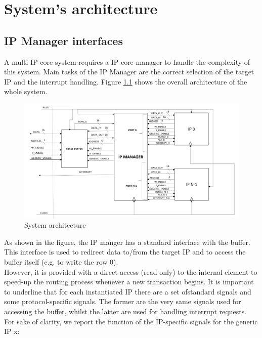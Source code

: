 \chapter{System's architecture}
\label{chap1}
\section{IP Manager interfaces}
A multi IP-core system requires a IP core manager to handle the complexity of this system.
Main tasks of the IP Manager are the correct selection of the target IP and the interrupt handling. Figure \ref{00fig} shows the overall architecture of the whole system. 
	\begin{figure}[h]
		\centering
		\includegraphics[width=\textwidth]{chapters/figures/00.png}  
		\caption{System architecture}
		\label{00fig}
	\end{figure}
	
	As shown in the figure, the IP manger has a standard interface with the buffer. This interface is used to redirect data to/from the target IP and to access the buffer itself (e.g. to write the row 0).\\ However, it is
	provided with a direct access (read-only) to the internal element to speed-up the routing process whenever a new transaction begins. It is important to underline that for each instantiated IP there are a set ofstandard signals and some protocol-specific signals. The former are the very same signals used for accessing the buffer, whilst the latter are used for handling interrupt requests. For sake of clarity, we report the function of the IP-specific signals for the generic IP x:
